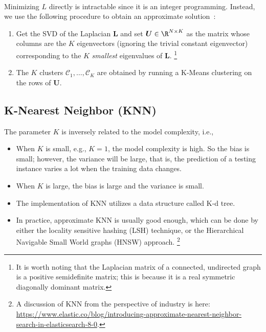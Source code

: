 {\begin{equation}
\begin{aligned}
                \end{aligned}
            \end{equation}
        Minimizing $L$ directly is intractable since it is an integer programming.
        Instead, we use the following procedure to obtain an approximate solution~\cite{shalev2014understanding}:
            \begin{enumerate}
                \item Get the SVD of the Laplacian $\bm{L}$ and set $\bm{U} \in \R^{\ndata \times K}$ as the matrix whose columns are the $K$ eigenvectors (ignoring the trivial constant eigenvector) corresponding to the $K$ \emph{smallest} eigenvalues of $\bm{L}$.
                \footnote{It is worth noting that the Laplacian matrix of a connected, undirected graph is a positive semidefinite matrix; this is because it is a real symmetric diagonally dominant matrix.}
                \item The $K$ clusters $\mathcal{C}_1,\ldots, \mathcal{C}_K$ are obtained by running a K-Means clustering on the rows of $\bm{U}$.
            \end{enumerate}
        
        
\subsection{K-Nearest Neighbor (KNN)}
    The parameter $K$ is inversely related to the model complexity, i.e., 
    \begin{itemize}
        \item When $K$ is small, e.g., $K=1$, the model complexity is high. So the bias is small; however, the variance will be large, that is, the prediction of a testing instance varies a lot when the training data changes. 
        \item When $K$ is large, the bias is large and the variance is small.
        \item The implementation of KNN utilizes a data structure called K-d tree. 
        \item In practice, approximate KNN is usually good enough, which can be done by either the locality sensitive hashing (LSH) technique, or the  Hierarchical Navigable Small World graphs (HNSW) approach.
        \footnote{A discussion of KNN from the perspective of industry is here: \url{https://www.elastic.co/blog/introducing-approximate-nearest-neighbor-search-in-elasticsearch-8-0}.}
    \end{itemize}


}
